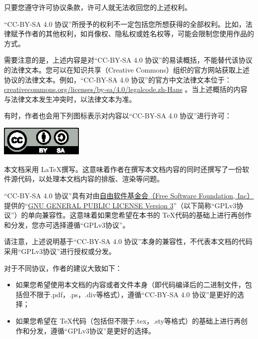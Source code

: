 只要您遵守许可协议条款，许可人就无法收回您的上述权利。

“CC-BY-SA 4.0 协议”所授予的权利不一定包括您所想获得的全部权利。比如，法律赋予作者的其他权利，如肖像权、隐私权或姓名权等，可能会限制您使用作品的方式。

需要注意的是，上述内容是对“CC-BY-SA 4.0 协议”的易读概括，不能替代该协议的法律文本。您可以在知识共享（Creative Commons）组织的官方网站获取上述协议的法律文本。例如，“CC-BY-SA 4.0 协议”的官方中文法律文本位于：\href{https://creativecommons.org/licenses/by-sa/4.0/legalcode.zh-Hans}{creativecommons.org/licenses/by-sa/4.0/legalcode.zh-Hans} 。当上述概括的内容与法律文本发生冲突时，以法律文本为准。

有时，作者也会用下列图标表示对内容以“CC-BY-SA 4.0 协议”进行许可：

\begin{center}
    \includegraphics[width = 0.3\textwidth]{pic/CC-BY-SA/BY-SA.eps}
\end{center}

本文档采用 \LaTeX 撰写。这意味着作者在撰写本文档内容的同时还撰写了一份软件源代码，以处理本文档内容的排版、渲染等问题。

“CC-BY-SA 4.0 协议”具有对由\href{https://www.fsf.org/}{自由软件基金会（Free Software Foundation, Inc）}提供的“\href{https://www.gnu.org/licenses/gpl-3.0.html}{GNU GENERAL PUBLIC LICENSE Version 3}”（以下简称“GPLv3协议”）的单向兼容性。这意味着如果您希望在本书的 \TeX 代码的基础上进行再创作和分发，您亦可选择遵循“GPLv3协议”。 


请注意，上述说明基于“CC-BY-SA 4.0 协议”本身的兼容性，不代表本文档的代码采用“GPLv3协议”进行授权或分发。

对于不同协议，作者的建议大致如下：

\begin{itemize}
    \item 如果您希望使用本文档的内容或者文件本身（即代码编译后的二进制文件，包括但不限于.pdf，.ps，.div等格式），遵循“CC-BY-SA 4.0 协议”是更好的选择；
    
    \item 如果您希望在 \TeX 代码（包括但不限于.tex，.sty等格式）的基础上进行再创作和分发，遵循“GPLv3协议”是更好的选择。
\end{itemize}

